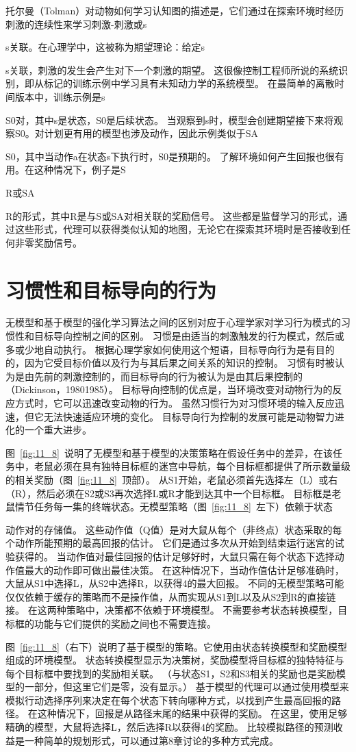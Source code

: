 {{{{{{托尔曼（Tolman）对动物如何学习认知图的描述是，它们通过在探索环境时经历刺激的连续性来学习刺激-刺激或s{s关联。在心理学中，这被称为期望理论：给定s{s关联，刺激的发生会产生对下一个刺激的期望。
这很像控制工程师所说的系统识别，即从标记的训练示例中学习具有未知动力学的系统模型。
在最简单的离散时间版本中，训练示例是s{S0对，其中s是状态，S0是后续状态。
当观察到s时，模型会创建期望接下来将观察S0。对计划更有用的模型也涉及动作，因此示例类似于SA{S0，其中当动作a在状态s下执行时，S0是预期的。
了解环境如何产生回报也很有用。在这种情况下，例子是S{R或SA{R的形式，其中R是与S或SA对相关联的奖励信号。
这些都是监督学习的形式，通过这些形式，代理可以获得类似认知的地图，无论它在探索其环境时是否接收到任何非零奖励信号。


\section{习惯性和目标导向的行为} \label{sec:habitual_behavior}

无模型和基于模型的强化学习算法之间的区别对应于心理学家对学习行为模式的习惯性和目标导向控制之间的区别。
习惯是由适当的刺激触发的行为模式，然后或多或少地自动执行。
根据心理学家如何使用这个短语，目标导向行为是有目的的，因为它受目标价值以及行为与其后果之间关系的知识的控制。
习惯有时被认为是由先前的刺激控制的，而目标导向的行为被认为是由其后果控制的（Dickinson，19801985）。
目标导向控制的优点是，当环境改变对动物行为的反应方式时，它可以迅速改变动物的行为。
虽然习惯行为对习惯环境的输入反应迅速，但它无法快速适应环境的变化。
目标导向行为控制的发展可能是动物智力进化的一个重大进步。


图~\ref{fig:11_8}~说明了无模型和基于模型的决策策略在假设任务中的差异，在该任务中，老鼠必须在具有独特目标框的迷宫中导航，每个目标框都提供了所示数量级的相关奖励（图~\ref{fig:11_8}~顶部）。
从S1开始，老鼠必须首先选择左（L）或右（R），然后必须在S2或S3再次选择L或R才能到达其中一个目标框。
目标框是老鼠情节任务每一集的终端状态。无模型策略（图~\ref{fig:11_8}~左下）依赖于状态{动作对的存储值。
这些动作值（Q值）是对大鼠从每个（非终点）状态采取的每个动作所能预期的最高回报的估计。
它们是通过多次从开始到结束运行迷宫的试验获得的。
当动作值对最佳回报的估计足够好时，大鼠只需在每个状态下选择动作值最大的动作即可做出最佳决策。
在这种情况下，当动作值估计足够准确时，大鼠从S1中选择L，从S2中选择R，以获得4的最大回报。
不同的无模型策略可能仅仅依赖于缓存的策略而不是操作值，从而实现从S1到L以及从S2到R的直接链接。
在这两种策略中，决策都不依赖于环境模型。
不需要参考状态转换模型，目标框的功能与它们提供的奖励之间也不需要连接。


图~\ref{fig:11_8}（右下）说明了基于模型的策略。它使用由状态转换模型和奖励模型组成的环境模型。
状态转换模型显示为决策树，奖励模型将目标框的独特特征与每个目标框中要找到的奖励相关联。
（与状态S1，S2和S3相关的奖励也是奖励模型的一部分，但这里它们是零，没有显示。）
基于模型的代理可以通过使用模型来模拟行动选择序列来决定在每个状态下转向哪种方式，以找到产生最高回报的路径。
在这种情况下，回报是从路径末尾的结果中获得的奖励。
在这里，使用足够精确的模型，大鼠将选择L，然后选择R以获得4的奖励。
比较模拟路径的预测收益是一种简单的规划形式，可以通过第8章讨论的多种方式完成。


}}}}}}}}}}}}}
